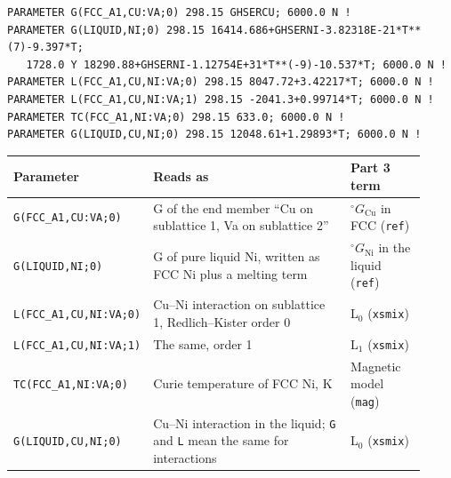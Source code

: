 \documentclass[12pt,a4paper]{article}
\begin{document}
\begin{lstlisting}[basicstyle={\footnotesize\ttfamily}]
PARAMETER G(FCC_A1,CU:VA;0) 298.15 GHSERCU; 6000.0 N !
PARAMETER G(LIQUID,NI;0) 298.15 16414.686+GHSERNI-3.82318E-21*T**(7)-9.397*T;
   1728.0 Y 18290.88+GHSERNI-1.12754E+31*T**(-9)-10.537*T; 6000.0 N !
PARAMETER L(FCC_A1,CU,NI:VA;0) 298.15 8047.72+3.42217*T; 6000.0 N !
PARAMETER L(FCC_A1,CU,NI:VA;1) 298.15 -2041.3+0.99714*T; 6000.0 N !
PARAMETER TC(FCC_A1,NI:VA;0) 298.15 633.0; 6000.0 N !
PARAMETER G(LIQUID,CU,NI;0) 298.15 12048.61+1.29893*T; 6000.0 N !
\end{lstlisting}
\begingroup\small
\begin{longtable}{>{\raggedright\arraybackslash}p{0.178\linewidth}>{\raggedright\arraybackslash}p{0.550\linewidth}>{\raggedright\arraybackslash}p{0.192\linewidth}}
\toprule
\textbf{Parameter} & \textbf{Reads as} & \textbf{Part 3 term} \\
\midrule
\endhead
\texttt{G(FCC\_\allowbreak{}A1,\allowbreak{}CU:VA;0)} & G of the end member ``Cu on sublattice 1, Va on sublattice 2'' & \(^{\circ} G_{\mathrm{Cu}}\) in FCC (\texttt{ref}) \\
\texttt{G(LIQUID,\allowbreak{}NI;0)} & G of pure liquid Ni, written as FCC Ni plus a melting term & \(^{\circ} G_{\mathrm{Ni}}\) in the liquid (\texttt{ref}) \\
\texttt{L(FCC\_\allowbreak{}A1,\allowbreak{}CU,\allowbreak{}NI:VA;0)} & Cu--Ni interaction on sublattice 1, Redlich--Kister order 0 & L\(_{0}\) (\texttt{xsmix}) \\
\texttt{L(FCC\_\allowbreak{}A1,\allowbreak{}CU,\allowbreak{}NI:VA;1)} & The same, order 1 & L\(_{1}\) (\texttt{xsmix}) \\
\texttt{TC(FCC\_\allowbreak{}A1,\allowbreak{}NI:VA;0)} & Curie temperature of FCC Ni, K & Magnetic model (\texttt{mag}) \\
\texttt{G(LIQUID,\allowbreak{}CU,\allowbreak{}NI;0)} & Cu--Ni interaction in the liquid; \texttt{G} and \texttt{L} mean the same for interactions & L\(_{0}\) (\texttt{xsmix}) \\
\bottomrule
\end{longtable}
\endgroup

\end{document}
